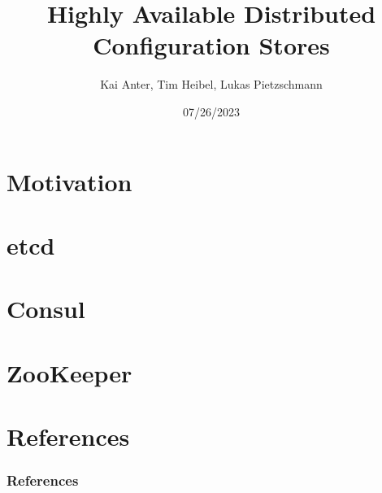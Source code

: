 \documentclass[aspectratio=169, usepdftitle=false]{beamer}
\title[Highly Available Distributed Config Stores]{Highly Available Distributed Configuration Stores}
\author[Kai, Tim, Lukas]{Kai Anter, Tim Heibel, Lukas Pietzschmann}
\subtitle{}
\institute{Institute of Distributed Systems}
\date{07/26/2023}
\begin{document}
\maketitle

\section{Motivation}


\section{etcd}


\section{Consul}


\section{ZooKeeper}


\section{References}
\begin{frame}[allowframebreaks]
	\frametitle{References}
	\printbibliography
\end{frame}
\end{document}
